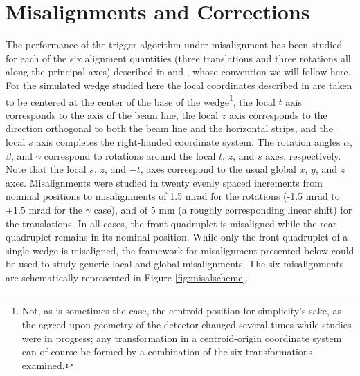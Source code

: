 \section{Misalignments and Corrections}
The performance of the trigger algorithm under misalignment has been studied for each of the six alignment quantities (three translations and three rotations all along the principal axes) described in \cite{Chevalier:684070} and \cite{Chevalier:684070}, whose convention we will follow here.  For the simulated wedge studied here the local coordinates described in \cite{Chevalier:684070} are taken to be centered at the center of the base of the wedge\footnote{Not, as is sometimes the case, the centroid position for simplicity's sake, as the agreed upon geometry of the detector changed several times while studies were in progress; any  transformation in a centroid-origin coordinate system can of course be formed by a combination of the six transformations examined.}, the local $t$ axis corresponds to the axis of the beam line, the local $z$ axis corresponds to the direction orthogonal to both the beam line and the horizontal strips, and the local $s$ axis completes the right-handed coordinate system.  The rotation angles $\alpha$, $\beta$, and $\gamma$ correspond to rotations around the local $t$, $z$, and $s$ axes, respectively.  Note that the local $s$, $z$, and $-t$, axes correspond to the usual global $x$, $y$, and $z$ axes.  Misalignments were studied in twenty evenly spaced increments from nominal positions to misalignments of 1.5 mrad for the rotations (-1.5 mrad to +1.5 mrad for the $\gamma$ case), and of 5 mm (a roughly corresponding linear shift) for the translations.  In all cases, the front quadruplet is misaligned while the rear quadruplet remains in its nominal position.  While only the front quadruplet of a single wedge is misaligned, the framework for misalignment presented below could be used to study generic local and global misalignments.  The six misalignments are schematically represented in Figure \ref{fig:misalscheme}.  
\label{sec:mal}
